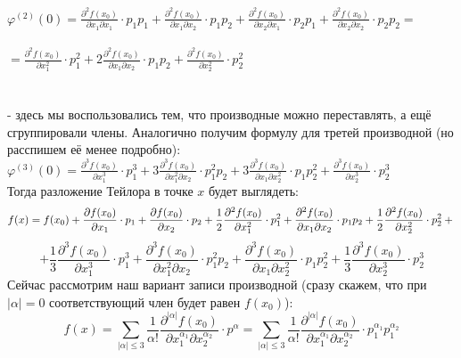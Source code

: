 \documentclass[book, 11pt]{report}
\begin{document}
{        $\displaystyle \varphi^{(2)}(0)=\frac{\partial^2f(x_0)}{\partial x_{1}\partial x_{1}}\cdot p_1p_1+\frac{\partial^2f(x_0)}{\partial x_{1}\partial x_{2}}\cdot p_1p_2+\frac{\partial^2f(x_0)}{\partial x_{2}\partial x_{1}}\cdot p_2p_1+\frac{\partial^2f(x_0)}{\partial x_{2}\partial x_{2}}\cdot p_2p_2=$\\ \\
        $\displaystyle=\frac{\partial^2f(x_0)}{\partial x_{1}^2}\cdot p_1^2+2\frac{\partial^2f(x_0)}{\partial x_{1}\partial x_{2}}\cdot p_1p_2+\frac{\partial^2f(x_0)}{\partial x_{2}^2}\cdot p_2^2$ \\ \\ \\
        - здесь мы воспользовались тем, что производные можно переставлять, а ещё сгруппировали члены. Аналогично получим формулу для третей производной (но расспишем её менее подробно):\\
        $\displaystyle \varphi^{(3)}(0)=\frac{\partial^3f(x_0)}{\partial x_1^3}\cdot p_1^3+3\frac{\partial^3f(x_0)}{\partial x_1^2\partial x_2}\cdot p_1^2p_2+3\frac{\partial^3f(x_0)}{\partial x_1\partial x_2^2}\cdot p_1p_2^2+\frac{\partial^3f(x_0)}{\partial x_2^3}\cdot p_2^3$
        \\
        Тогда разложение Тейлора в точке $x$ будет выглядеть:
        \begin{equation*}
            f(x)=f(x_0)+\frac{\partial f(x_0)}{\partial x_1}\cdot p_1+\frac{\partial f(x_0)}{\partial x_2}\cdot p_2+\frac{1}{2}\frac{\partial^2f(x_0)}{\partial x_{1}^2}\cdot p_1^2+\frac{\partial^2f(x_0)}{\partial x_{1}\partial x_{2}}\cdot p_1p_2+\frac{1}{2}\frac{\partial^2f(x_0)}{\partial x_{2}^2}\cdot p_2^2+ \\
        \end{equation*}
        \begin{equation*}
            +\frac{1}{3}\frac{\partial^3f(x_0)}{\partial x_1^3}\cdot p_1^3+\frac{\partial^3f(x_0)}{\partial x_1^2\partial x_2}\cdot p_1^2p_2+\frac{\partial^3f(x_0)}{\partial x_1\partial x_2^2}\cdot p_1p_2^2+\frac{1}{3}\frac{\partial^3f(x_0)}{\partial x_2^3}\cdot p_2^3
        \end{equation*}
        \newpage
        Сейчас рассмотрим наш вариант записи производной (сразу скажем, что при $|\alpha|=0$ соответствующий член будет равен $f(x_0)$):
        \begin{equation*}
            f(x)=\sum_{|\alpha|\leq3}\frac{1}{\alpha!}\frac{\partial^{|\alpha|}f(x_0)}{\partial x_1^{\alpha_1}\partial x_2^{\alpha_2}}\cdot p^{\alpha}=\sum_{|\alpha|\leq3}\frac{1}{\alpha!}\frac{\partial^{|\alpha|}f(x_0)}{\partial x_1^{\alpha_1}\partial x_2^{\alpha_2}}\cdot p_1^{\alpha_1}p_1^{\alpha_2}

\end{equation*}}
\end{document}
